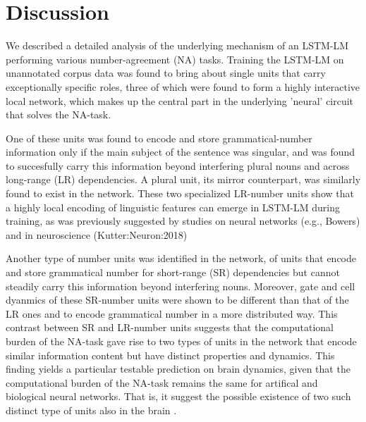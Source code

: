 
\section{Discussion}
We described a detailed analysis of the underlying mechanism of an LSTM-LM performing various number-agreement (NA) tasks. Training the LSTM-LM on unannotated corpus data was found to bring about single units that carry exceptionally specific roles, three of which were found to form a highly interactive local network, which makes up the central part in the underlying 'neural' circuit that solves the NA-task. 

One of these units was found to encode and store grammatical-number information only if the main subject of the sentence was singular, and was found to succesfully carry this information beyond interfering plural nouns and across long-range (LR) dependencies. A plural unit, its mirror counterpart, was similarly found to exist in the network. These two specialized LR-number units show that a highly local encoding of linguistic features can emerge in LSTM-LM during training, as was previously suggested by studies on neural networks (e.g., Bowers) and in neuroscience (Kutter:Neuron:2018)

Another type of number units was identified in the network, of units that encode and store grammatical number for short-range (SR) dependencies but cannot steadily carry this information beyond interfering nouns. Moreover, gate and cell dyanmics of these SR-number units were shown to be different than that of the LR ones and to encode grammatical number in a more distributed way. This contrast between SR and LR-number units suggests that the computational burden of the NA-task gave rise to two types of units in the network that encode similar information content but have distinct properties and dynamics. This finding yields a particular testable prediction on brain dynamics, given that the computational burden of the NA-task remains the same for artifical and biological neural networks. That is, it suggest the possible existence of two such distinct type of units also in the brain .

